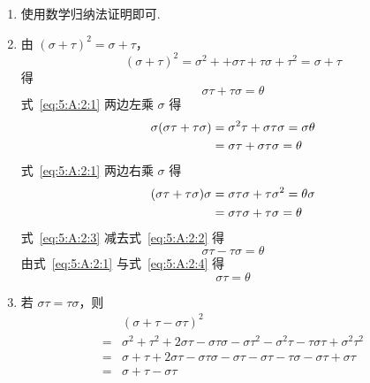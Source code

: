 \documentclass[12pt,fontset=fandol]{ctexart}
\begin{document}
\begin{solve}
\begin{enumerate}
                \item 使用数学归纳法证明即可.

                \item 由 $ (\sigma + \tau)^2 = \sigma + \tau $，
                      \[ (\sigma + \tau)^2 = \sigma^2 + + \sigma \tau + \tau \sigma + \tau^2 = \sigma + \tau \]
                      得
                      \begin{equation} \label{eq:5:A:2:1}
                          \sigma \tau + \tau \sigma = \theta
                      \end{equation}
                      式~\eqref{eq:5:A:2:1} 两边左乘 $ \sigma $ 得
                      \begin{align}
                          \sigma(\sigma \tau + \tau \sigma) & = \sigma^2 \tau + \sigma \tau \sigma = \sigma \theta \notag    \\
                                                            & = \sigma \tau + \sigma \tau \sigma = \theta \label{eq:5:A:2:2}
                      \end{align}
                      式~\eqref{eq:5:A:2:1} 两边右乘 $ \sigma $ 得
                      \begin{align}
                          (\sigma \tau + \tau \sigma)\sigma & = \sigma \tau \sigma + \tau \sigma^2 = \theta \sigma \notag    \\
                                                            & = \sigma \tau \sigma + \tau \sigma = \theta \label{eq:5:A:2:3}
                      \end{align}
                      式~\eqref{eq:5:A:2:3} 减去式~\eqref{eq:5:A:2:2} 得
                      \begin{equation}
                          \sigma \tau - \tau \sigma = \theta \label{eq:5:A:2:4}
                      \end{equation}
                      由式~\eqref{eq:5:A:2:1} 与式~\eqref{eq:5:A:2:4} 得
                      \[ \sigma \tau = \theta \]

                \item 若 $ \sigma \tau = \tau \sigma $，则
                      \begin{align*}
                              & (\sigma + \tau - \sigma \tau)^2                                                                                             \\
                          ={} & \sigma^2 + \tau^2 + 2 \sigma \tau - \sigma \tau \sigma - \sigma \tau^2 - \sigma^2 \tau - \tau \sigma \tau + \sigma^2 \tau^2 \\
                          ={} & \sigma + \tau + 2 \sigma \tau - \sigma \tau \sigma - \sigma \tau - \sigma \tau - \tau \sigma - \sigma \tau + \sigma \tau    \\
                          ={} & \sigma + \tau - \sigma \tau
                      \end{align*}
            \end{enumerate}
\end{solve}
\end{document}
